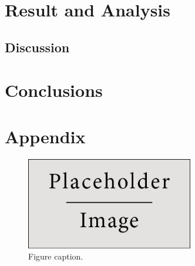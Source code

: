 \documentclass{article}
\begin{document}


\section{Result and Analysis}
	\subsection{Discussion}
	
	


\section{Conclusions}




\section{Appendix}

\begin{figure}[h]
\begin{center}
\includegraphics[width=0.65\textwidth]{placeholder} %
\caption{Figure caption.}
\end{center}
\end{figure}
\end{document}

